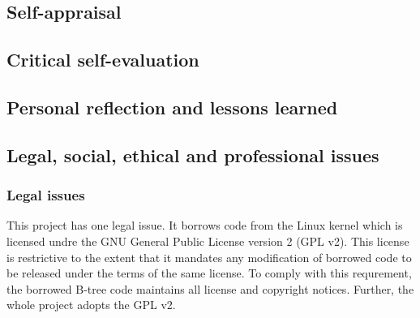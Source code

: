 \begin{appendices}

%
%
\chapter{Self-appraisal}


    \section{Critical self-evaluation}

    \section{Personal reflection and lessons learned}

    \section{Legal, social, ethical and professional issues}


        \subsection{Legal issues}
            \label{app_licence}

            This project has one legal issue. It borrows code from the Linux
            kernel which is licensed undre the GNU General Public License
            version 2 (GPL v2). This license is restrictive to the extent that
            it mandates any modification of borrowed code to be released under
            the terms of the same license. To comply with this requrement, the
            borrowed B-tree code maintains all license and copyright notices.
            Further, the whole project adopts the GPL v2.



\end{appendices}
